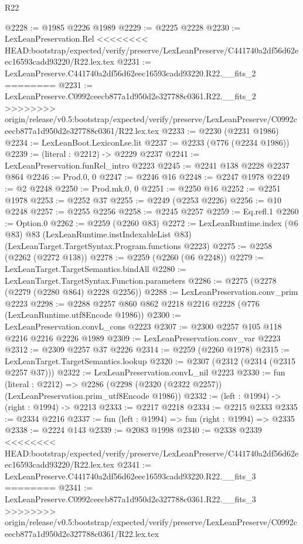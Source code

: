 \begin{lexlean}{R22}
\begin{coremodule}
{{{{{{{{{{{{{{{{{{{{{{{{{{{{{{{{{{{{{{{{{{{{{{{{{{{{@2228 := @1985 @2226 @1989
@2229 := @2225 @2228
@2230 := LexLeanPreservation.Rel
<<<<<<<< HEAD:bootstrap/expected/verify/preserve/LexLeanPreserve/C441740a2df56d62eec16593cadd93220/R22.lex.tex
@2231 := LexLeanPreserve.C441740a2df56d62eec16593cadd93220.R22.__fits_2
========
@2231 := LexLeanPreserve.C0992ceecb877a1d950d2e327788c0361.R22.__fits_2
>>>>>>>> origin/release/v0.5:bootstrap/expected/verify/preserve/LexLeanPreserve/C0992ceecb877a1d950d2e327788c0361/R22.lex.tex
@2233 := @2230 (@2231 @1986)
@2234 := LexLeanBoot.LexiconLse.lit
@2237 := @2233 (@776 (@2234 @1986))
@2239 := (literal : @2212) -> @2229 @2237
@2241 := LexLeanPreservation.funRel_intro @2223
@2245 := @2241 @138 @2228 @2237 @864
@2246 := Prod.{0, 0}
@2247 := @2246 @16
@2248 := @2247 @1978
@2249 := @2 @2248
@2250 := Prod.mk.{0, 0}
@2251 := @2250 @16
@2252 := @2251 @1978
@2253 := @2252 @37
@2255 := @2249 (@2253 @2226)
@2256 := @10 @2248
@2257 := @2255 @2256
@2258 := @2245 @2257
@2259 := Eq.refl.{1}
@2260 := Option.{0}
@2262 := @2259 (@2260 @83)
@2272 := LexLeanRuntime.index
    (@6 @83)
    @83
    (LexLeanRuntime.instIndexableList @83)
    (LexLeanTarget.TargetSyntax.Program.functions @2223)
@2275 := @2258 (@2262 (@2272 @138))
@2278 := @2259 (@2260 (@6 @2248))
@2279 := LexLeanTarget.TargetSemantics.bindAll
@2280 := LexLeanTarget.TargetSyntax.Function.parameters
@2286 := @2275 (@2278 (@2279 (@2280 @864) @2228 @2256))
@2288 := LexLeanPreservation.conv_prim @2223
@2298 := @2288 @2257 @860 @862 @2218 @2216 @2228 (@776 (LexLeanRuntime.utf8Encode @1986))
@2300 := LexLeanPreservation.convL_cons @2223
@2307 := @2300 @2257 @105 @118 @2216 @2216 @2226 @1989
@2309 := LexLeanPreservation.conv_var @2223
@2312 := @2309 @2257 @37 @2226
@2314 := @2259 (@2260 @1978)
@2315 := LexLeanTarget.TargetSemantics.lookup
@2320 := @2307 (@2312 (@2314 (@2315 @2257 @37)))
@2322 := LexLeanPreservation.convL_nil @2223
@2330 := fun (literal : @2212) =>
  @2286 (@2298 (@2320 (@2322 @2257)) (LexLeanPreservation.prim_utf8Encode @1986))
@2332 := (left : @1994) -> (right : @1994) -> @2213
@2333 := @2217 @2218
@2334 := @2215 @2333
@2335 := @2334 @2216
@2337 := fun (left : @1994) => fun (right : @1994) => @2335
@2338 := @2224 @143
@2339 := @2083 @1998
@2340 := @2338 @2339
<<<<<<<< HEAD:bootstrap/expected/verify/preserve/LexLeanPreserve/C441740a2df56d62eec16593cadd93220/R22.lex.tex
@2341 := LexLeanPreserve.C441740a2df56d62eec16593cadd93220.R22.__fits_3
========
@2341 := LexLeanPreserve.C0992ceecb877a1d950d2e327788c0361.R22.__fits_3
>>>>>>>> origin/release/v0.5:bootstrap/expected/verify/preserve/LexLeanPreserve/C0992ceecb877a1d950d2e327788c0361/R22.lex.tex
}}}}}}}}}}}}}}}}}}}}}}}}}}}}}}}}}}}}}}}}}}}}}}}}}}}}
\end{coremodule}
\end{lexlean}
